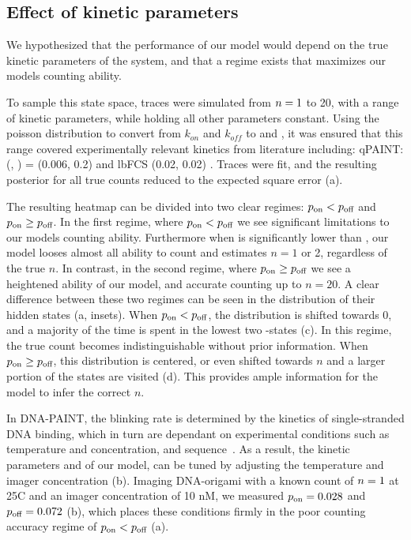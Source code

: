 \subsection{Effect of kinetic parameters}
We hypothesized that the performance of our model would depend on the true kinetic parameters of the system, 
and that a regime exists that maximizes our models counting ability.

To sample this state space, traces were simulated from $n=1$ to 20, with a range of kinetic parameters, 
while holding all other parameters constant.
	Using the poisson distribution to convert from $k_{on}$ and $k_{off}$ to \pon and \poff,
	it was ensured that this range covered experimentally relevant kinetics from literature including:
	qPAINT: (\pon, \poff) = (0.006, 0.2) \cite{jungmann_2016} and lbFCS (0.02, 0.02) \cite{stein_2021}. 
	Traces were fit, and the resulting posterior for all true counts reduced to the expected 
	square error (a).

The resulting heatmap can be divided into two clear regimes: $p_\text{on} < p_\text{off}$ and $p_\text{on} \geq p_\text{off}$.
	In the first regime, where $p_\text{on} < p_\text{off}$ we see significant limitations to our models counting ability.
	Furthermore when \pon is significantly lower than \poff, our model looses almost 
	all ability to count and estimates $n=1$ or 2, regardless of the true $n$.
	In contrast, in the second regime, where $p_\text{on} \geq p_\text{off}$ we see a heightened ability of our model, 
	and accurate counting up to $n=20$.
	A clear difference between these two regimes can be seen in the distribution 
	of their hidden states \z{} (a, insets).
	When $p_\text{on} < p_\text{off}$, the distribution is shifted towards 0, and a majority 
	of the time is spent in the lowest two \z{}-states (c). 
	In this regime, the true count becomes indistinguishable without prior information. 
	When $p_\text{on} \geq p_\text{off}$, this distribution is centered, or even shifted towards $n$ 
	and a larger portion of the states are visited (d). 
	This provides ample information for the model to infer the correct $n$.
	
In DNA-PAINT, the blinking rate is determined by the kinetics of single-stranded DNA binding,
which in turn are dependant on experimental conditions such as temperature and concentration, 
and sequence~\citep{jungmann_single-molecule_2010}.
	As a result, the kinetic parameters \pon and \poff of our model, can be 
	tuned by adjusting the temperature and imager concentration (b).
	Imaging DNA-origami with a known count of $n=1$ at 25\textdegree C and an 
	imager concentration of 10 nM, we measured $p_\text{on}=0.028$ and $p_\text{off}=0.072$ 
	(b),
	which places these conditions firmly in the poor counting 
	accuracy regime of $p_\text{on} < p_\text{off}$ (a). %
	
